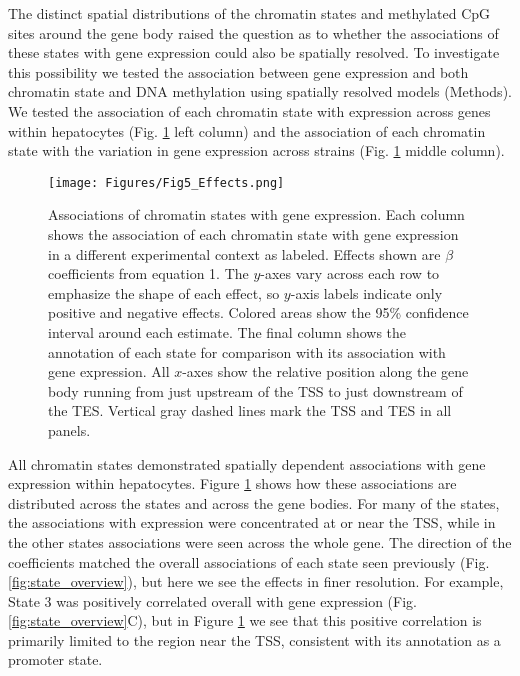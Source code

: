 \documentclass[
  11pt,
]{article}
\begin{document}
The distinct spatial distributions of the chromatin states and
methylated CpG sites around the gene body raised the question as to
whether the associations of these states with gene expression could also
be spatially resolved. To investigate this possibility we tested the
association between gene expression and both chromatin state and DNA
methylation using spatially resolved models (Methods). We tested the
association of each chromatin state with expression across genes within
hepatocytes (Fig. \ref{fig:state_effects} left column) and the
association of each chromatin state with the variation in gene
expression across strains (Fig. \ref{fig:state_effects} middle column).

\begin{figure}[ht!]
\texttt{[image: Figures/Fig5\_Effects.png]}
\caption{Associations of chromatin states with gene expression. Each 
column shows the association of each chromatin state with gene 
expression in a different experimental context as labeled. 
Effects shown are $\beta$ coefficients from equation 1. The 
$y$-axes vary across each row to emphasize the shape of each effect, 
so $y$-axis labels indicate only positive and negative effects. 
Colored areas show the 95\% confidence interval around each 
estimate. The final column shows the annotation of each state for 
comparison with its association with gene expression. All $x$-axes 
show the relative position along the gene body running from just 
upstream of the TSS to just downstream of the TES. Vertical gray 
dashed lines mark the TSS and TES in all panels.
}
\label{fig:state_effects}
\end{figure}

All chromatin states demonstrated spatially dependent associations with
gene expression within hepatocytes. Figure \ref{fig:state_effects} shows
how these associations are distributed across the states and across the
gene bodies. For many of the states, the associations with expression
were concentrated at or near the TSS, while in the other states
associations were seen across the whole gene. The direction of the
coefficients matched the overall associations of each state seen
previously (Fig. \ref{fig:state_overview}), but here we see the effects
in finer resolution. For example, State 3 was positively correlated
overall with gene expression (Fig. \ref{fig:state_overview}C), but in
Figure \ref{fig:state_effects} we see that this positive correlation is
primarily limited to the region near the TSS, consistent with its
annotation as a promoter state.
\end{document}

